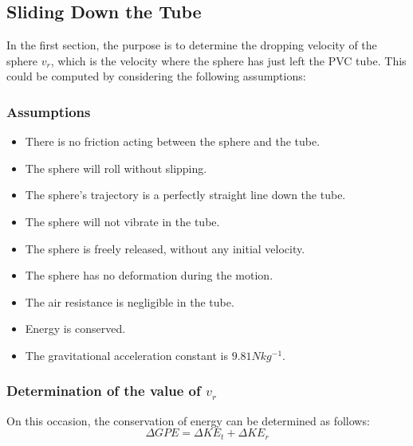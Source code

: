 \documentclass{article}
\begin{document}
    \subsection{Sliding Down the Tube}
        In the first section, the purpose is to determine the dropping velocity of the sphere $v_r$, which is the velocity where the sphere has just left the PVC tube. This could be computed by considering the following assumptions:
        \subsubsection{Assumptions}
            \begin{itemize}
                \item There is no friction acting between the sphere and the tube.
                \item The sphere will roll without slipping.
                \item The sphere's trajectory is a perfectly straight line down the tube.
                \item The sphere will not vibrate in the tube.
                \item The sphere is freely released, without any initial velocity.
                \item The sphere has no deformation during the motion.
                \item The air resistance is negligible in the tube.
                \item Energy is conserved.
                \item The gravitational acceleration constant is $9.81Nkg^{-1}$.
            \end{itemize}

    
        \subsubsection{Determination of the value of $v_r$}
            On this occasion, the conservation of energy can be determined as follows:
            \begin{equation}
                \Delta GPE = \Delta KE_t + \Delta KE_r \nonumber
            \end{equation}
\end{document}
